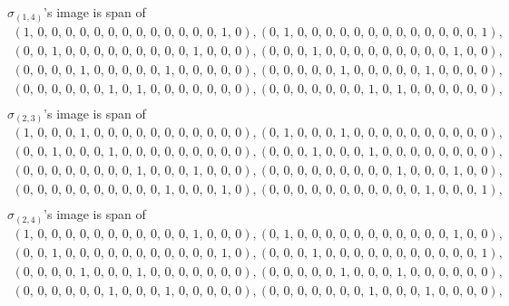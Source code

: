 \documentclass[8pt]{article}\usepackage{amsmath}
\begin{document}
\( \sigma_{(1, 4)}\)'s image is span of   
\begin{align*} \left(1,\,0,\,0,\,0,\,0,\,0,\,0,\,0,\,0,\,0,\,0,\,0,\,0,\,0,\,1,\,0\right) , \left(0,\,1,\,0,\,0,\,0,\,0,\,0,\,0,\,0,\,0,\,0,\,0,\,0,\,0,\,0,\,1\right) , \\ 
 \left(0,\,0,\,1,\,0,\,0,\,0,\,0,\,0,\,0,\,0,\,0,\,0,\,1,\,0,\,0,\,0\right) , \left(0,\,0,\,0,\,1,\,0,\,0,\,0,\,0,\,0,\,0,\,0,\,0,\,0,\,1,\,0,\,0\right) , \\ 
 \left(0,\,0,\,0,\,0,\,1,\,0,\,0,\,0,\,0,\,0,\,1,\,0,\,0,\,0,\,0,\,0\right) , \left(0,\,0,\,0,\,0,\,0,\,1,\,0,\,0,\,0,\,0,\,0,\,1,\,0,\,0,\,0,\,0\right) , \\ 
 \left(0,\,0,\,0,\,0,\,0,\,0,\,1,\,0,\,1,\,0,\,0,\,0,\,0,\,0,\,0,\,0\right) , \left(0,\,0,\,0,\,0,\,0,\,0,\,0,\,1,\,0,\,1,\,0,\,0,\,0,\,0,\,0,\,0\right) , \\ \end{align*}
\( \sigma_{(2, 3)}\)'s image is span of   
\begin{align*} \left(1,\,0,\,0,\,0,\,1,\,0,\,0,\,0,\,0,\,0,\,0,\,0,\,0,\,0,\,0,\,0\right) , \left(0,\,1,\,0,\,0,\,0,\,1,\,0,\,0,\,0,\,0,\,0,\,0,\,0,\,0,\,0,\,0\right) , \\ 
 \left(0,\,0,\,1,\,0,\,0,\,0,\,1,\,0,\,0,\,0,\,0,\,0,\,0,\,0,\,0,\,0\right) , \left(0,\,0,\,0,\,1,\,0,\,0,\,0,\,1,\,0,\,0,\,0,\,0,\,0,\,0,\,0,\,0\right) , \\ 
 \left(0,\,0,\,0,\,0,\,0,\,0,\,0,\,0,\,1,\,0,\,0,\,0,\,1,\,0,\,0,\,0\right) , \left(0,\,0,\,0,\,0,\,0,\,0,\,0,\,0,\,0,\,1,\,0,\,0,\,0,\,1,\,0,\,0\right) , \\ 
 \left(0,\,0,\,0,\,0,\,0,\,0,\,0,\,0,\,0,\,0,\,1,\,0,\,0,\,0,\,1,\,0\right) , \left(0,\,0,\,0,\,0,\,0,\,0,\,0,\,0,\,0,\,0,\,0,\,1,\,0,\,0,\,0,\,1\right) , \\ \end{align*}
\( \sigma_{(2, 4)}\)'s image is span of   
\begin{align*} \left(1,\,0,\,0,\,0,\,0,\,0,\,0,\,0,\,0,\,0,\,0,\,0,\,1,\,0,\,0,\,0\right) , \left(0,\,1,\,0,\,0,\,0,\,0,\,0,\,0,\,0,\,0,\,0,\,0,\,0,\,1,\,0,\,0\right) , \\ 
 \left(0,\,0,\,1,\,0,\,0,\,0,\,0,\,0,\,0,\,0,\,0,\,0,\,0,\,0,\,1,\,0\right) , \left(0,\,0,\,0,\,1,\,0,\,0,\,0,\,0,\,0,\,0,\,0,\,0,\,0,\,0,\,0,\,1\right) , \\ 
 \left(0,\,0,\,0,\,0,\,1,\,0,\,0,\,0,\,1,\,0,\,0,\,0,\,0,\,0,\,0,\,0\right) , \left(0,\,0,\,0,\,0,\,0,\,1,\,0,\,0,\,0,\,1,\,0,\,0,\,0,\,0,\,0,\,0\right) , \\ 
 \left(0,\,0,\,0,\,0,\,0,\,0,\,1,\,0,\,0,\,0,\,1,\,0,\,0,\,0,\,0,\,0\right) , \left(0,\,0,\,0,\,0,\,0,\,0,\,0,\,1,\,0,\,0,\,0,\,1,\,0,\,0,\,0,\,0\right) , \\ \end{align*}
\end{document}
